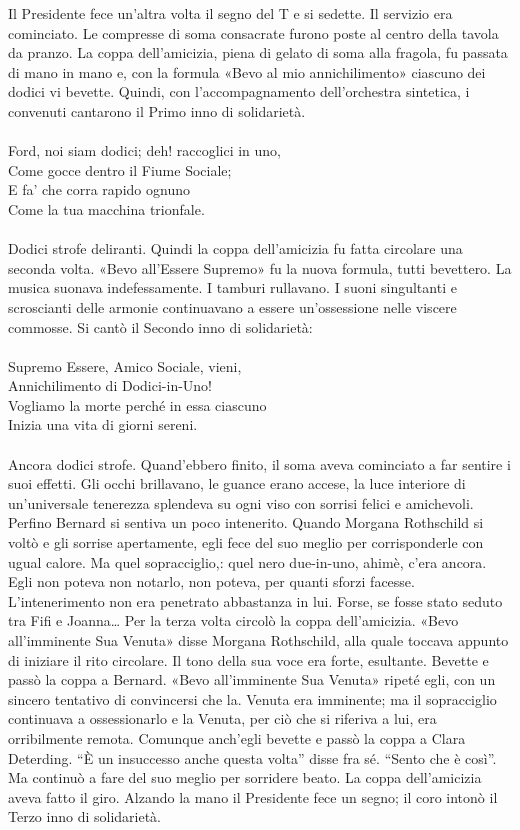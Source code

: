 \documentclass[
a5paper, %
10pt, %
twoside, 
onecolumn, %
openany, %
]{memoir}
\begin{document}
Il Presidente fece un’altra volta il segno del T e si sedette. Il servizio era cominciato. Le compresse di soma consacrate furono poste al centro della tavola da pranzo. La coppa dell’amicizia, piena di gelato di soma alla fragola, fu passata di mano in mano e, con la formula «Bevo al mio annichilimento» ciascuno dei dodici vi bevette. Quindi, con l’accompagnamento dell’orchestra sintetica, i convenuti cantarono il Primo inno di solidarietà.
\leavevmode\\\leavevmode\\
{\tiny Ford, noi siam dodici; deh! raccoglici in uno,\\
Come gocce dentro il Fiume Sociale;\\
E fa’ che corra rapido ognuno\\
Come la tua macchina trionfale.}
\leavevmode\\\leavevmode\\
Dodici strofe deliranti. Quindi la coppa dell’amicizia fu fatta circolare una seconda volta. «Bevo all’Essere Supremo» fu la nuova formula, tutti bevettero. La musica suonava indefessamente. I tamburi rullavano. I suoni singultanti e scroscianti delle armonie continuavano a essere un’ossessione nelle viscere commosse. Si cantò il Secondo inno di solidarietà:
\leavevmode\\\leavevmode\\
{\tiny Supremo Essere, Amico Sociale, vieni,\\
Annichilimento di Dodici-in-Uno!\\
Vogliamo la morte perché in essa ciascuno\\
Inizia una vita di giorni sereni.}
\leavevmode\\\leavevmode\\
Ancora dodici strofe. Quand’ebbero finito, il soma aveva cominciato a far sentire i suoi effetti. Gli occhi brillavano, le guance erano accese, la luce interiore di un’universale tenerezza splendeva su ogni viso con sorrisi felici e amichevoli. Perfino Bernard si sentiva un poco intenerito. Quando Morgana Rothschild si voltò e gli sorrise apertamente, egli fece del suo meglio per corrisponderle con ugual calore. Ma quel sopracciglio,: quel nero due-in-uno, ahimè, c’era ancora. Egli non poteva non notarlo, non poteva, per quanti sforzi facesse. L’intenerimento non era penetrato abbastanza in lui. Forse, se fosse stato seduto tra Fifi e Joanna… Per la terza volta circolò la coppa dell’amicizia. «Bevo all’imminente Sua Venuta» disse Morgana Rothschild, alla quale toccava appunto di iniziare il rito circolare. Il tono della sua voce era forte, esultante. Bevette e passò la coppa a Bernard. «Bevo all’imminente Sua Venuta» ripeté egli, con un sincero tentativo di convincersi che la. Venuta era imminente; ma il sopracciglio continuava a ossessionarlo e la Venuta, per ciò che si riferiva a lui, era orribilmente remota. Comunque anch’egli bevette e passò la coppa a Clara Deterding. “È un insuccesso anche questa volta” disse fra sé. “Sento che è così”. Ma continuò a fare del suo meglio per sorridere beato. La coppa dell’amicizia aveva fatto il giro. Alzando la mano il Presidente fece un segno; il coro intonò il Terzo inno di solidarietà.
\end{document}
